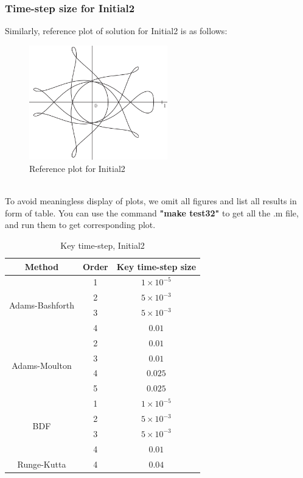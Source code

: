 \documentclass[a4paper,twocolumn]{article}
\theoremstyle{definition}
\begin{document}
\subsubsection{Time-step size for Initial2}
Similarly, reference plot of solution for Initial2 is as follows:
\begin{figure}[!htp]   
	\centering
	\includegraphics[width=6cm]{Pictures/I2.png}
	\caption{Reference plot for Initial2}
	\label{fig:R2}
\end{figure}\\
To avoid meaningless display of plots, we omit all figures and list all results in form of table. You can use the command \textbf{"make test32"} to get all the .m file, and run them to get corresponding plot.
\newpage
\begin{table}[!htp]
	\centering
	\begin{tabular}{|c|c|c|}
		\hline
		Method & Order & Key time-step size \\
		\hline	
		\multirow{4}{*}{Adams-Bashforth} & 1 & $1\times 10^{-5}$  \\
		\cline{2-3}		
		 & 2 &$5\times 10^{-3}$\\	
		\cline{2-3}		
		 & 3 &$5\times 10^{-3}$  \\	
		\cline{2-3} 
		 & 4 &$0.01$  \\
		\hline
		\multirow{4}{*}{Adams-Moulton} & 2 & $0.01$  \\
		\cline{2-3}		
		& 3 &$0.01$\\	
		\cline{2-3}		
		& 4 &$0.025$  \\	
		\cline{2-3} 
		& 5 &$0.025$  \\
		\hline
		\multirow{4}{*}{BDF} & 1 & $1\times 10^{-5}$  \\
		\cline{2-3}		
		& 2 &$5\times 10^{-3}$\\	
		\cline{2-3}		
		& 3 &$5\times 10^{-3}$  \\	
		\cline{2-3} 
		& 4 &$0.01$  \\
		\hline
		Runge-Kutta & 4 & $0.04$ \\
		\hline
	\end{tabular}
	\caption{Key time-step, Initial2}
	\label{tab:test35}
\end{table}
\end{document}
